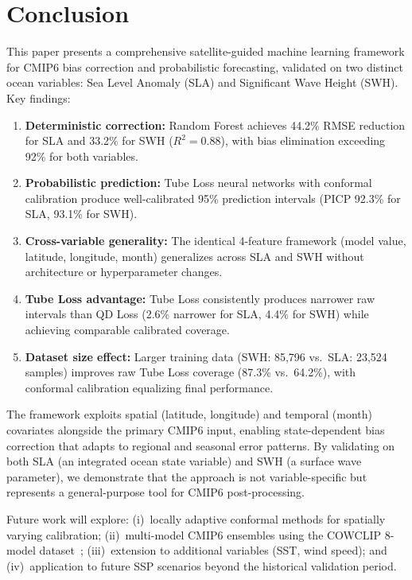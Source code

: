 \documentclass[conference]{IEEEtran}
\begin{document}
\section{Conclusion}

This paper presents a comprehensive satellite-guided machine learning framework for CMIP6 bias correction and probabilistic forecasting, validated on two distinct ocean variables: Sea Level Anomaly (SLA) and Significant Wave Height (SWH). Key findings:
\begin{enumerate}
    \item \textbf{Deterministic correction:} Random Forest achieves 44.2\% RMSE reduction for SLA and 33.2\% for SWH ($R^2=0.88$), with bias elimination exceeding 92\% for both variables.
    \item \textbf{Probabilistic prediction:} Tube Loss neural networks with conformal calibration produce well-calibrated 95\% prediction intervals (PICP 92.3\% for SLA, 93.1\% for SWH).
    \item \textbf{Cross-variable generality:} The identical 4-feature framework (model value, latitude, longitude, month) generalizes across SLA and SWH without architecture or hyperparameter changes.
    \item \textbf{Tube Loss advantage:} Tube Loss consistently produces narrower raw intervals than QD Loss (2.6\% narrower for SLA, 4.4\% for SWH) while achieving comparable calibrated coverage.
    \item \textbf{Dataset size effect:} Larger training data (SWH: 85,796 vs.\ SLA: 23,524 samples) improves raw Tube Loss coverage (87.3\% vs.\ 64.2\%), with conformal calibration equalizing final performance.
\end{enumerate}

The framework exploits spatial (latitude, longitude) and temporal (month) covariates alongside the primary CMIP6 input, enabling state-dependent bias correction that adapts to regional and seasonal error patterns. By validating on both SLA (an integrated ocean state variable) and SWH (a surface wave parameter), we demonstrate that the approach is not variable-specific but represents a general-purpose tool for CMIP6 post-processing.

Future work will explore: (i)~locally adaptive conformal methods for spatially varying calibration; (ii)~multi-model CMIP6 ensembles using the COWCLIP 8-model dataset~\cite{morim2024}; (iii)~extension to additional variables (SST, wind speed); and (iv)~application to future SSP scenarios beyond the historical validation period.
\end{document}
